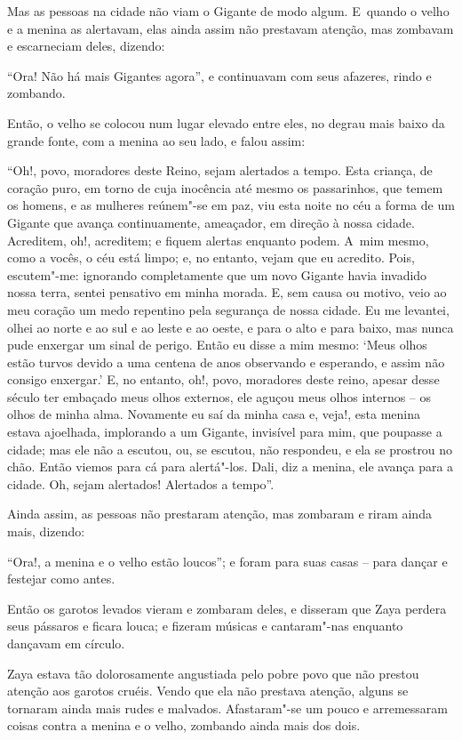 Mas as pessoas na cidade não viam o Gigante de modo algum. E~quando o
velho e a menina as alertavam, elas ainda assim não prestavam atenção,
mas zombavam e escarneciam deles, dizendo:

``Ora! Não há mais Gigantes agora'', e continuavam com seus afazeres,
rindo e zombando.

Então, o velho se colocou num lugar elevado entre eles, no degrau mais
baixo da grande fonte, com a menina ao seu lado, e falou assim:

``Oh!, povo, moradores deste Reino, sejam alertados a tempo. Esta
criança, de coração puro, em torno de cuja inocência até mesmo os
passarinhos, que temem os homens, e as mulheres reúnem"-se em paz, viu
esta noite no céu a forma de um Gigante que avança continuamente,
ameaçador, em direção à nossa cidade. Acreditem, oh!, acreditem; e
fiquem alertas enquanto podem. A~mim mesmo, como a vocês, o céu está
limpo; e, no entanto, vejam que eu acredito. Pois, escutem"-me: ignorando
completamente que um novo Gigante havia invadido nossa terra, sentei
pensativo em minha morada. E, sem causa ou motivo, veio ao meu coração
um medo repentino pela segurança de nossa cidade. Eu me levantei, olhei
ao norte e ao sul e ao leste e ao oeste, e para o alto e para baixo, mas
nunca pude enxergar um sinal de perigo. Então eu disse a mim mesmo:
`Meus olhos estão turvos devido a uma centena de anos observando e
esperando, e assim não consigo enxergar.' E, no entanto, oh!, povo,
moradores deste reino, apesar desse século ter embaçado meus olhos
externos, ele aguçou meus olhos internos -- os olhos de minha alma.
Novamente eu saí da minha casa e, veja!, esta menina estava ajoelhada,
implorando a um Gigante, invisível para mim, que poupasse a cidade; mas
ele não a escutou, ou, se escutou, não respondeu, e ela se prostrou no
chão. Então viemos para cá para alertá"-los. Dali, diz a menina, ele
avança para a cidade. Oh, sejam alertados! Alertados a tempo''.

Ainda assim, as pessoas não prestaram atenção, mas zombaram e riram
ainda mais, dizendo:

``Ora!, a menina e o velho estão loucos''; e foram para suas casas --
para dançar e festejar como antes.

Então os garotos levados vieram e zombaram deles, e disseram que Zaya
perdera seus pássaros e ficara louca; e fizeram músicas e cantaram"-nas
enquanto dançavam em círculo.

Zaya estava tão dolorosamente angustiada pelo pobre povo que não prestou
atenção aos garotos cruéis. Vendo que ela não prestava atenção, alguns
se tornaram ainda mais rudes e malvados. Afastaram"-se um pouco e
arremessaram coisas contra a menina e o velho, zombando ainda mais dos
dois.

